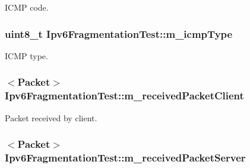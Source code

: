 I\+C\+MP code. 

\subsubsection[{\texorpdfstring{m\+\_\+icmp\+Type}{m_icmpType}}]{\setlength{\rightskip}{0pt plus 5cm}uint8\+\_\+t Ipv6\+Fragmentation\+Test\+::m\+\_\+icmp\+Type\hspace{0.3cm}{\ttfamily [private]}}\hypertarget{classIpv6FragmentationTest_ae933968023c4913c690cb92eb06fa9f8}{}\label{classIpv6FragmentationTest_ae933968023c4913c690cb92eb06fa9f8}


I\+C\+MP type. 

\subsubsection[{\texorpdfstring{m\+\_\+received\+Packet\+Client}{m_receivedPacketClient}}]{$<${\bf Packet}$>$ Ipv6\+Fragmentation\+Test\+::m\+\_\+received\+Packet\+Client\hspace{0.3cm}{\ttfamily [private]}}\hypertarget{classIpv6FragmentationTest_af8d5fd0d59dea9ddb85589998728fea6}{}\label{classIpv6FragmentationTest_af8d5fd0d59dea9ddb85589998728fea6}


Packet received by client. 

\subsubsection[{\texorpdfstring{m\+\_\+received\+Packet\+Server}{m_receivedPacketServer}}]{$<${\bf Packet}$>$ Ipv6\+Fragmentation\+Test\+::m\+\_\+received\+Packet\+Server\hspace{0.3cm}{\ttfamily [private]}}\hypertarget{classIpv6FragmentationTest_abe697e5a49ddbe098865a13c306d2f94}{}\label{classIpv6FragmentationTest_abe697e5a49ddbe098865a13c306d2f94}


